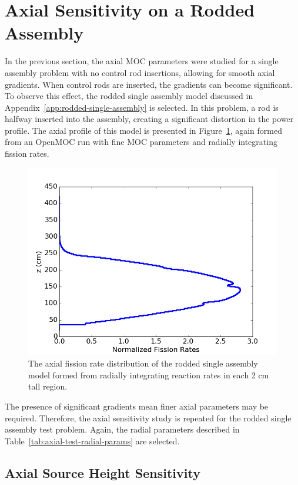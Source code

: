 \newpage
\section{Axial Sensitivity on a Rodded Assembly}
\label{sec:axial-sensitivity-rodded}

In the previous section, the axial \ac{MOC} parameters were studied for a single assembly problem with no control rod insertions, allowing for smooth axial gradients. When control rods are inserted, the gradients can become significant. To observe this effect, the rodded single assembly model discussed in Appendix~\ref{app:rodded-single-assembly} is selected. In this problem, a rod is halfway inserted into the assembly, creating a significant distortion in the power profile. The axial profile of this model is presented in Figure~\ref{fig:single-assembly-rodded-axial}, again formed from an OpenMOC run with fine \ac{MOC} parameters and radially integrating fission rates.

\begin{figure}[h!]
	\centering
	\includegraphics[width=0.7\linewidth]{figures/results/rr-plots/single-assembly-rodded-axial.png}
	\caption[]{The axial fission rate distribution of the rodded single assembly model formed from radially integrating reaction rates in each 2 cm tall region.}
	\label{fig:single-assembly-rodded-axial}
\end{figure}

The presence of significant gradients mean finer axial parameters may be required. Therefore, the axial sensitivity study is repeated for the rodded single assembly test problem. Again, the radial parameters described in Table~\ref{tab:axial-test-radial-params} are selected.

\subsection{Axial Source Height Sensitivity}

